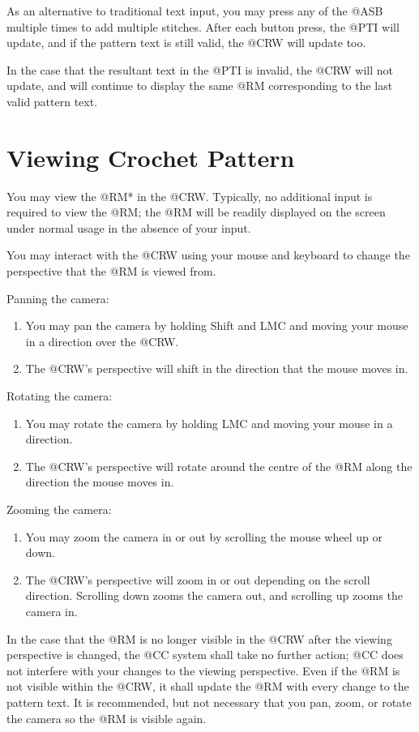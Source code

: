 \documentclass[main.tex]{subfiles}
\begin{document}
As an alternative to traditional text input, you may press any of the @ASB multiple times to add multiple stitches. After each button press, the @PTI will update, and if the pattern text is still valid, the @CRW will update too.

In the case that the resultant text in the @PTI is invalid, the @CRW will not update, and will continue to display the same @RM corresponding to the last valid pattern text.

\section{Viewing Crochet Pattern}

You may view the @RM* in the @CRW. Typically, no additional input is required to view the @RM; the @RM will be readily displayed on the screen under normal usage in the absence of your input.

You may interact with the @CRW using your mouse and keyboard to change the perspective that the @RM is viewed from.

Panning the camera:
\begin{enumerate}
\item You may pan the camera by holding Shift and LMC and moving your mouse in a direction over the @CRW.
\item The @CRW's perspective will shift in the direction that the mouse moves in.
\end{enumerate}

Rotating the camera:
\begin{enumerate}
\item You may rotate the camera by holding LMC and moving your mouse in a direction.
\item The @CRW's perspective will rotate around the centre of the @RM along the direction the mouse moves in.
\end{enumerate}

Zooming the camera:
\begin{enumerate}
\item You may zoom the camera in or out by scrolling the mouse wheel up or down. 
\item The @CRW's perspective will zoom in or out depending on the scroll direction. Scrolling down zooms the camera out, and scrolling up zooms the camera in.
\end{enumerate}

In the case that the @RM is no longer visible in the @CRW after the viewing perspective is changed, the @CC system shall take no further action; @CC does not interfere with your changes to the viewing perspective. Even if the @RM is not visible within the @CRW, it shall update the @RM with every change to the pattern text. It is recommended, but not necessary that you pan, zoom, or rotate the camera so the @RM is visible again.
\end{document}
